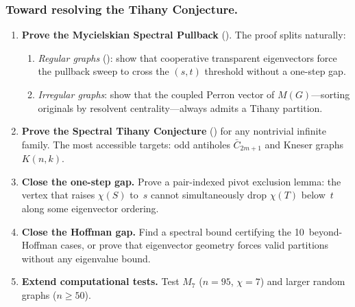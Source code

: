 \documentclass[11pt]{amsart}
\theoremstyle{definition}
\theoremstyle{remark}
\begin{document}
\subsubsection*{Toward resolving the Tihany Conjecture.}

\begin{enumerate}
\item \textbf{Prove the Mycielskian Spectral Pullback} 
  ().  The proof splits naturally:
  \begin{enumerate}[label=(\alph*)]
  \item \emph{Regular graphs} (): show that 
    cooperative transparent eigenvectors force the pullback sweep to 
    cross the $(s,t)$ threshold without a one-step gap.
  \item \emph{Irregular graphs}: show that the coupled Perron vector 
    of $M(G)$---sorting originals by resolvent centrality---always 
    admits a Tihany partition.
  \end{enumerate}

\item \textbf{Prove the Spectral Tihany Conjecture} 
  () for any nontrivial infinite family.  
  The most accessible targets: odd antiholes $\bar{C}_{2m+1}$ and 
  Kneser graphs $K(n,k)$.

\item \textbf{Close the one-step gap.}  Prove a pair-indexed pivot 
  exclusion lemma: the vertex that raises $\chi(S)$ to~$s$ cannot 
  simultaneously drop $\chi(T)$ below~$t$ along some eigenvector ordering.

\item \textbf{Close the Hoffman gap.}  Find a spectral bound certifying 
  the 10~beyond-Hoffman cases, or prove that eigenvector geometry forces 
  valid partitions without any eigenvalue bound.

\item \textbf{Extend computational tests.}  Test $M_7$ ($n = 95$, 
  $\chi = 7$) and larger random graphs ($n \ge 50$).
\end{enumerate}


\end{document}
